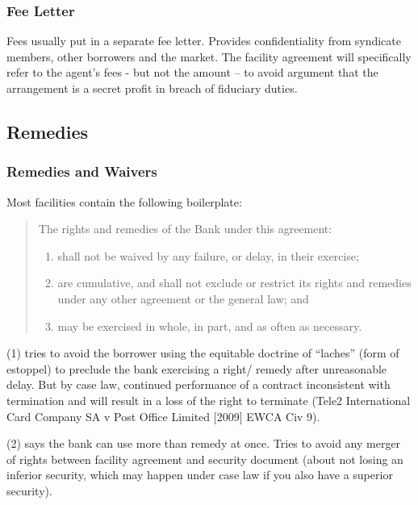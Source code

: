 \documentclass[
]{article}
\providecommand{\tightlist}{%
  \setlength{\itemsep}{0pt}\setlength{\parskip}{0pt}}
\begin{document}
\hypertarget{fee-letter}{%
\subsubsection{Fee Letter}\label{fee-letter}}

Fees usually put in a separate fee letter. Provides confidentiality from
syndicate members, other borrowers and the market. The facility
agreement will specifically refer to the agent's fees - but not the
amount -- to avoid argument that the arrangement is a secret profit in
breach of fiduciary duties.

\hypertarget{remedies}{%
\subsection{Remedies}\label{remedies}}

\hypertarget{remedies-and-waivers}{%
\subsubsection{Remedies and Waivers}\label{remedies-and-waivers}}

Most facilities contain the following boilerplate:

\begin{quote}
The rights and remedies of the Bank under this agreement:

\begin{enumerate}
\tightlist
\item
  shall not be waived by any failure, or delay, in their exercise;
\item
  are cumulative, and shall not exclude or restrict its rights and
  remedies under any other agreement or the general law; and
\item
  may be exercised in whole, in part, and as often as necessary.
\end{enumerate}
\end{quote}

(1) tries to avoid the borrower using the equitable doctrine of
``laches'' (form of estoppel) to preclude the bank exercising a right/
remedy after unreasonable delay. But by case law, continued performance
of a contract inconsistent with termination and will result in a loss of
the right to terminate (Tele2 International Card Company SA v Post
Office Limited {[}2009{]} EWCA Civ 9).

(2) says the bank can use more than remedy at once. Tries to avoid any
merger of rights between facility agreement and security document (about
not losing an inferior security, which may happen under case law if you
also have a superior security).
\end{document}
